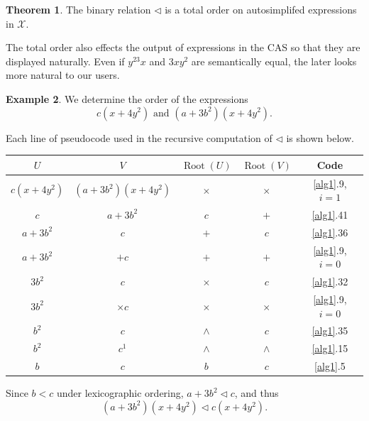 \documentclass{article}
\theoremstyle{definition}
\newtheorem{thm}{Theorem}[section]
\newtheorem{exa}[thm]{Example}
\DeclareMathOperator{\pow}{\wedge}
\DeclareMathOperator{\Root}{Root}
\begin{document}
\begin{thm}
    The binary relation $\lhd$ is a total order on autosimplifed expressions in $\mathcal{X}$.
\end{thm}

The total order also effects the output of expressions in the CAS so that they are displayed naturally. Even if $y^23x$ and $3xy^2$ are semantically equal, the later looks more natural to our users.

\begin{exa}
    We determine the order of the expressions
    \begin{equation*}
       c(x+4y^2) \text{ and } (a+3b^2)(x+4y^2).
    \end{equation*}
    
    Each line of pseudocode used in the recursive computation of $\lhd$ is shown below.
    \begin{center}
    \begin{tabular}{|c|c|c|c|c|}
        \hline 
        $U$& $V$& $\Root(U)$ & $\Root(V)$ & Code \\
        \hline
         $c(x+4y^2)$& $(a+3b^2)(x+4y^2)$&$\times$&$\times$&\ref{alg1}.9, $i=1$\\
         $c$&$a+3b^2$&$c$&$+$&\ref{alg1}.41\\ 
         $a+3b^2$&$c$&$+$&$c$&\ref{alg1}.36\\
         $a+3b^2$&$+c$&$+$&$+$&\ref{alg1}.9, $i=0$\\
         $3b^2$&$c$&$\times$&$c$&\ref{alg1}.32\\
         $3b^2$&$\times c$&$\times$&$\times$&\ref{alg1}.9, $i=0$\\
         $b^2$&$c$&$\pow$&$c$&\ref{alg1}.35\\
         $b^2$&$c^1$&$\pow$&$\pow$&\ref{alg1}.15\\
         $b$&$c$&$b$&$c$&\ref{alg1}.5\\
         \hline
    \end{tabular}
    \end{center}
    
    Since $b<c$ under lexicographic ordering, $a+3b^2 \lhd c$, and thus 
    \[(a+3b^2)(x+4y^2) \lhd c(x+4y^2).\]
\end{exa}
\end{document}
